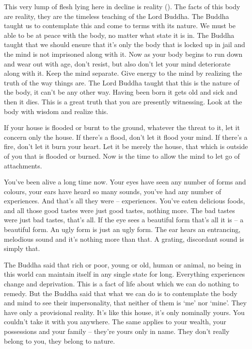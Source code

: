 This very lump of flesh lying here in decline is reality (). The facts of this body are reality, they are the timeless teaching of the Lord Buddha. The Buddha taught us to contemplate this and come to terms with its nature. We must be able to be at peace with the body, no matter what state it is in. The Buddha taught that we should ensure that it's only the body that is locked up in jail and the mind is not imprisoned along with it. Now as your body begins to run down and wear out with age, don't resist, but also don't let your mind deteriorate along with it. Keep the mind separate. Give energy to the mind by realizing the truth of the way things are. The Lord Buddha taught that this is the nature of the body, it can't be any other way. Having been born it gets old and sick and then it dies. This is a great truth that you are presently witnessing. Look at the body with wisdom and realize this. 

If your house is flooded or burnt to the ground, whatever the threat to it, let it concern only the house. If there's a flood, don't let it flood your mind. If there's a fire, don't let it burn your heart. Let it be merely the house, that which is outside of you that is flooded or burned. Now is the time to allow the mind to let go of attachments. 

You've been alive a long time now. Your eyes have seen any number of forms and colours, your ears have heard so many sounds, you've had any number of experiences. And that's all they were -- experiences. You've eaten delicious foods, and all those good tastes were just good tastes, nothing more. The bad tastes were just bad tastes, that's all. If the eye sees a beautiful form that's all it is -- a beautiful form. An ugly form is just an ugly form. The ear hears an entrancing, melodious sound and it's nothing more than that. A grating, discordant sound is simply that. 

The Buddha said that rich or poor, young or old, human or animal, no being in this world can maintain itself in any single state for long. Everything experiences change and deprivation. This is a fact of life about which we can do nothing to remedy. But the Buddha said that what we can do is to contemplate the body and mind to see their impersonality, that neither of them is `me' nor `mine'. They have only a provisional reality. It's like this house, it's only nominally yours. You couldn't take it with you anywhere. The same applies to your wealth, your possessions and your family -- they're yours only in name. They don't really belong to you, they belong to nature. 

